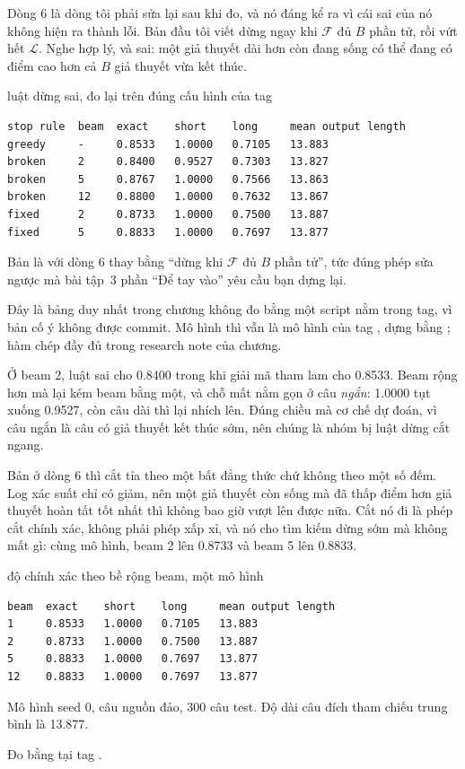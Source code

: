 Dòng 6 là dòng tôi phải sửa lại sau khi đo, và nó đáng kể ra vì cái sai của nó
không hiện ra thành lỗi. Bản đầu tôi viết dừng ngay khi \(\mathcal{F}\) đủ
\(B\) phần tử, rồi vứt hết \(\mathcal{L}\). Nghe hợp lý, và sai: một giả thuyết
dài hơn còn đang sống có thể đang có điểm cao hơn cả \(B\) giả thuyết vừa kết
thúc.

\begin{measured}{luật dừng sai, đo lại trên đúng cấu hình của tag }
\begin{verbatim}
stop rule  beam  exact    short    long     mean output length
greedy     -     0.8533   1.0000   0.7105   13.883
broken     2     0.8400   0.9527   0.7303   13.827
broken     5     0.8767   1.0000   0.7566   13.863
broken     12    0.8800   1.0000   0.7632   13.867
fixed      2     0.8733   1.0000   0.7500   13.887
fixed      5     0.8833   1.0000   0.7697   13.877
\end{verbatim}

Bản  là  với dòng 6 thay bằng
\enquote{dừng khi \(\mathcal{F}\) đủ \(B\) phần tử}, tức đúng phép sửa ngược mà
bài tập~3 phần \enquote{Để tay vào} yêu cầu bạn dựng lại.

Đây là bảng duy nhất trong chương không đo bằng một script nằm trong tag, vì
bản  cố ý không được commit. Mô hình thì vẫn là mô hình của tag
, dựng bằng ; hàm
 chép đầy đủ trong research note của chương.
\end{measured}

Ở beam 2, luật sai cho 0.8400 trong khi giải mã tham lam cho 0.8533. Beam rộng
hơn mà lại kém beam bằng một, và chỗ mất nằm gọn ở câu \emph{ngắn}: 1.0000 tụt
xuống 0.9527, còn câu dài thì lại nhích lên. Đúng chiều mà cơ chế dự đoán, vì
câu ngắn là câu có giả thuyết kết thúc sớm, nên chúng là nhóm bị luật dừng cắt
ngang.

Bản ở dòng 6 thì cắt tỉa theo một bất đẳng thức chứ không theo một số đếm. Log
xác suất chỉ có giảm, nên một giả thuyết còn sống mà đã thấp điểm hơn giả thuyết
hoàn tất tốt nhất thì không bao giờ vượt lên được nữa. Cắt nó đi là phép cắt
chính xác,
không phải phép xấp xỉ, và nó cho tìm kiếm dừng sớm mà không mất gì: cùng mô
hình, beam 2 lên 0.8733 và beam 5 lên 0.8833.

\begin{measured}{độ chính xác theo bề rộng beam, một mô hình}
\begin{verbatim}
beam  exact    short    long     mean output length
1     0.8533   1.0000   0.7105   13.883
2     0.8733   1.0000   0.7500   13.887
5     0.8833   1.0000   0.7697   13.877
12    0.8833   1.0000   0.7697   13.877
\end{verbatim}

Mô hình seed 0, câu nguồn đảo, 300 câu test. Độ dài câu đích tham chiếu trung
bình là 13.877.

Đo bằng  tại tag .
\end{measured}

